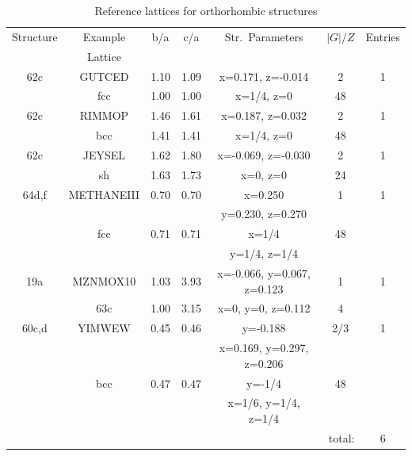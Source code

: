 \documentclass[preprint]{revtex4}              %
\begin{document}
\begin{table}
\caption{Reference lattices for orthorhombic structures}
\label{orth}
\begin{center}
\begin{tabular}{ccccccc}%
\cline{1-7}
Structure & Example & b/a & c/a & Str.\ Parameters & $|G|/Z$ & Entries \\
          & Lattice \\
\cline{1-7}
62c     & GUTCED    & 1.10  & 1.09  & x=0.171, z=-0.014   & 2  & 1 \\
        & fcc       & 1.00  & 1.00  & x=1/4, z=0         & 48 \\
62c     & RIMMOP    & 1.46  & 1.61  & x=0.187, z=0.032   & 2  & 1 \\
        & bcc       & 1.41  & 1.41  & x=1/4, z=0         & 48 \\
62c     & JEYSEL    & 1.62  & 1.80  & x=-0.069, z=-0.030   & 2  & 1 \\
        & sh        & 1.63  & 1.73  & x=0, z=0           & 24 \\
64d,f   & METHANEIII& 0.70  & 0.70  & x=0.250            & 1  & 1 \\
        &           &       &       & y=0.230, z=0.270    \\
        & fcc       & 0.71  & 0.71  & x=1/4              & 48 \\
        &           &       &       & y=1/4, z=1/4 \\
19a     & MZNMOX10  & 1.03  & 3.93  & x=-0.066, y=0.067, z=0.123 & 1 & 1 \\
        & 63c       & 1.00  & 3.15  & x=0, y=0, z=0.112          & 4 \\
60c,d   & YIMWEW    & 0.45  & 0.46  & y=-0.188            & 2/3 & 1 \\
        &           &       &       & x=0.169, y=0.297, z=0.206 \\
        & bcc       & 0.47  & 0.47  & y=-1/4              & 48 & \\
        &           &       &       & x=1/6, y=1/4, z=1/4 \\
\cline{7-7}
\multicolumn{6}{r}{total:} & 6 \\
\cline{1-7}
\end{tabular}
\end{center}
\end{table}
\end{document}
